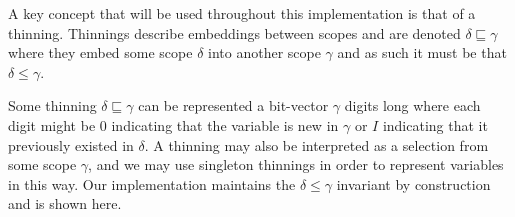 
A key concept that will be used throughout this implementation is that
of a thinning. Thinnings describe embeddings between scopes and are
denoted $δ ⊑ γ$ where they embed some scope $δ$ into another
scope $γ$ and as such it must be that $δ \leq γ$.

Some thinning $δ ⊑ γ$ can be represented a bit-vector $γ$ digits long where
each digit might be $0$ indicating that the variable is new in $γ$ or $I$
indicating that it previously existed in $δ$. A thinning may also be interpreted
as a selection from some scope $γ$, and we may use singleton thinnings in
order to represent variables in this way. Our implementation maintains the
$δ \leq γ$ invariant by construction and is shown here.

